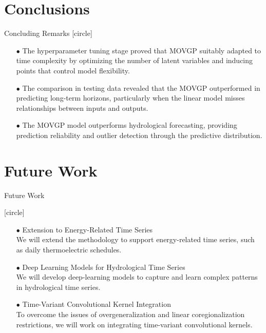 \documentclass[10pt, xcolor=table]{beamer}
\begin{document}
\section*{Conclusions}
\begin{frame}{Concluding Remarks}
    [circle]
    \setlength{\leftmargini}{15pt}
    \begin{itemize}
        \item[$\bullet$] The hyperparameter tuning stage proved that MOVGP suitably adapted to time complexity by optimizing the number of latent variables and inducing points that control model flexibility.
        \item[$\bullet$] The comparison in testing data revealed that the MOVGP outperformed in predicting long-term horizons, particularly when the linear model misses relationships between inputs and outputs.
        \item[$\bullet$] The MOVGP model outperforms hydrological forecasting, providing prediction reliability and outlier detection through the predictive distribution.
    \end{itemize}

\end{frame}

\section*{Future Work}
\begin{frame}{Future Work}

    [circle]
    \setlength{\leftmargini}{15pt}
    \begin{itemize}
        \item[$\bullet$] \textcolor{myNewColorA}{Extension to Energy-Related Time Series}\\
        We will extend the methodology to support energy-related time series, such as daily thermoelectric schedules.
        \item[$\bullet$] \textcolor{myNewColorA}{Deep Learning Models for Hydrological Time Series}\\
        We will develop deep-learning models to capture and learn complex patterns in hydrological time series.
        \item[$\bullet$] \textcolor{myNewColorA}{Time-Variant Convolutional Kernel Integration}\\
        To overcome the issues of overgeneralization and linear coregionalization restrictions, we will work on integrating time-variant convolutional kernels.
    \end{itemize}

\end{frame}
\end{document}
